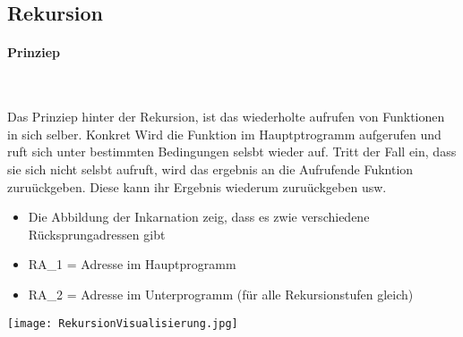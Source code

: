 	\subsection{Rekursion}
		\paragraph{Prinziep} \mbox{} \\
		\begin{minipage}{0.6\textwidth}
			Das Prinziep hinter der Rekursion, ist das wiederholte aufrufen von Funktionen
			in sich selber. Konkret Wird die Funktion im Hauptptrogramm aufgerufen und ruft sich
			unter bestimmten Bedingungen selsbt wieder auf. Tritt der Fall ein, dass sie sich nicht
			selsbt aufruft, wird das ergebnis an die Aufrufende Fukntion zuruückgeben. Diese kann
			ihr Ergebnis wiederum zuruückgeben usw.

			\begin{itemize}
				\item Die Abbildung der Inkarnation zeig, dass es zwie verschiedene Rücksprungadressen gibt
				\item RA\_1 = Adresse im Hauptprogramm
				\item RA\_2 = Adresse im Unterprogramm (für alle Rekursionstufen gleich)
			\end{itemize}
		\end{minipage}
		\begin{minipage}{0.35\textwidth}
			\texttt{[image: RekursionVisualisierung.jpg]}
		\end{minipage}
		\vspace{0.8cm}

